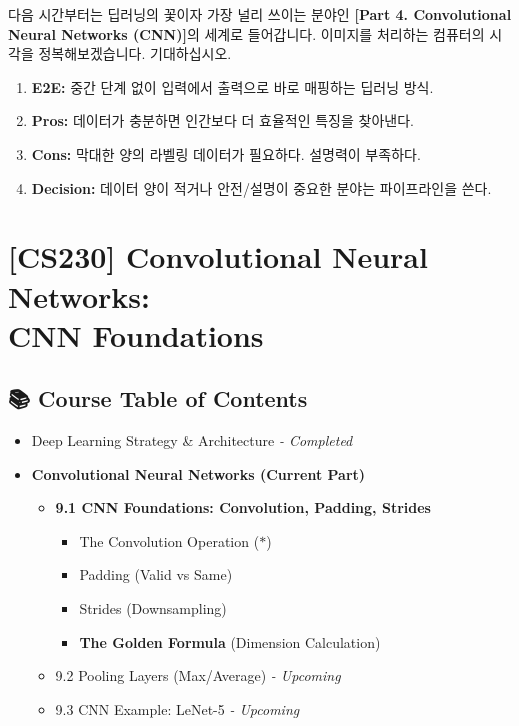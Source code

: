 \documentclass[11pt,a4paper]{book}
\theoremstyle{definition}
\begin{document}
다음 시간부터는 딥러닝의 꽃이자 가장 널리 쓰이는 분야인 \textbf{[Part 4. Convolutional Neural Networks (CNN)]}의 세계로 들어갑니다. 이미지를 처리하는 컴퓨터의 시각을 정복해보겠습니다. 기대하십시오.

\vspace{0.5cm}

\begin{summarybox}[title={단원 요약 (Cheat Sheet)}]
\begin{enumerate}
    \item \textbf{E2E:} 중간 단계 없이 입력에서 출력으로 바로 매핑하는 딥러닝 방식.
    \item \textbf{Pros:} 데이터가 충분하면 인간보다 더 효율적인 특징을 찾아낸다.
    \item \textbf{Cons:} 막대한 양의 라벨링 데이터가 필요하다. 설명력이 부족하다.
    \item \textbf{Decision:} 데이터 양이 적거나 안전/설명이 중요한 분야는 파이프라인을 쓴다.
\end{enumerate}
\end{summarybox}


\chapter{[CS230] Convolutional Neural Networks: \\ CNN Foundations}
\label{ch:lecture29}

\section*{📚 Course Table of Contents}
\begin{itemize}
    \item[Chapter 1-8.] Deep Learning Strategy \& Architecture \textit{- Completed}
    \item[\textbf{Chapter 9.}] \textbf{Convolutional Neural Networks (Current Part)}
    \begin{itemize}
        \item \textbf{9.1 CNN Foundations: Convolution, Padding, Strides}
        \begin{itemize}
            \item The Convolution Operation ($*$)
            \item Padding (Valid vs Same)
            \item Strides (Downsampling)
            \item \textbf{The Golden Formula} (Dimension Calculation)
        \end{itemize}
        \item 9.2 Pooling Layers (Max/Average) \textit{- Upcoming}
        \item 9.3 CNN Example: LeNet-5 \textit{- Upcoming}
    \end{itemize}
\end{itemize}
\end{document}

